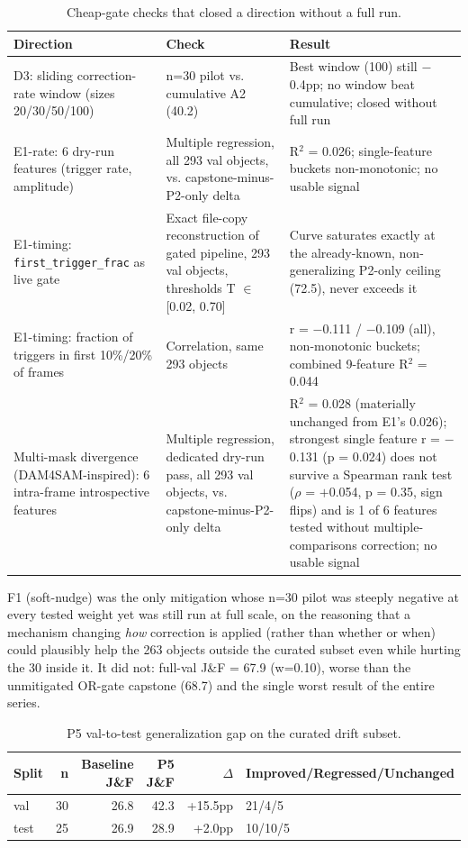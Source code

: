 \documentclass[11pt]{article}
\begin{document}
\begin{table}[!htbp]
\centering
\footnotesize
\caption{Cheap-gate checks that closed a direction without a full run.}
\label{tab:9}
\small
\begin{tabularx}{\textwidth}{@{}LLL@{}}
\toprule
Direction & Check & Result \\
\midrule
D3: sliding correction-rate window (sizes 20/30/50/100) & n=30 pilot vs. cumulative A2 (40.2) & Best window (100) still $-$0.4pp; no window beat cumulative; closed without full run \\
E1-rate: 6 dry-run features (trigger rate, amplitude) & Multiple regression, all 293 val objects, vs. capstone-minus-P2-only delta & R$^2$ = 0.026; single-feature buckets non-monotonic; no usable signal \\
E1-timing: \texttt{first\_trigger\_frac} as live gate & Exact file-copy reconstruction of gated pipeline, 293 val objects, thresholds T $\in$ [0.02, 0.70] & Curve saturates exactly at the already-known, non-generalizing P2-only ceiling (72.5), never exceeds it \\
E1-timing: fraction of triggers in first 10\%/20\% of frames & Correlation, same 293 objects & r = $-$0.111 / $-$0.109 (all), non-monotonic buckets; combined 9-feature R$^2$ = 0.044 \\
Multi-mask divergence (DAM4SAM-inspired): 6 intra-frame introspective features & Multiple regression, dedicated dry-run pass, all 293 val objects, vs. capstone-minus-P2-only delta & R$^2$ = 0.028 (materially unchanged from E1's 0.026); strongest single feature r = $-$0.131 (p = 0.024) does not survive a Spearman rank test ($\rho$ = $+$0.054, p = 0.35, sign flips) and is 1 of 6 features tested without multiple-comparisons correction; no usable signal \\
\bottomrule
\end{tabularx}
\end{table}

F1 (soft-nudge) was the only mitigation whose n=30 pilot was steeply negative at every tested weight yet was still run at full scale, on the reasoning that a mechanism changing \emph{how} correction is applied (rather than whether or when) could plausibly help the 263 objects outside the curated subset even while hurting the 30 inside it. It did not: full-val J\&F = 67.9 (w=0.10), worse than the unmitigated OR-gate capstone (68.7) and the single worst result of the entire series.

\begin{table}[!htbp]
\centering
\caption{P5 val-to-test generalization gap on the curated drift subset.}
\label{tab:10}
\small
\begin{tabularx}{\textwidth}{@{}lrrrrL@{}}
\toprule
Split & n & Baseline J\&F & P5 J\&F & $\Delta$ & Improved/Regressed/Unchanged \\
\midrule
val & 30 & 26.8 & 42.3 & +15.5pp & 21/4/5 \\
test & 25 & 26.9 & 28.9 & +2.0pp & 10/10/5 \\
\bottomrule
\end{tabularx}
\end{table}
\end{document}

